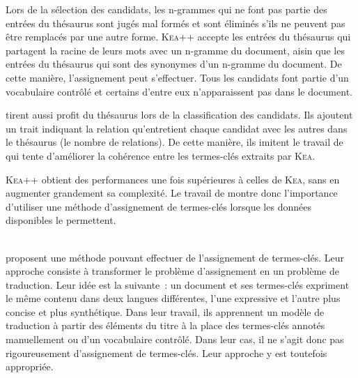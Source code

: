     Lors de la sélection des candidats, les n-grammes qui ne font pas partie des
    entrées du thésaurus sont jugés mal formés et sont éliminés s'ils ne peuvent
    pas être remplacés par une autre forme. \textsc{Kea}++ accepte les entrées
    du thésaurus qui partagent la racine de leurs mots avec un n-gramme du
    document, aisin que les entrées du thésaurus qui sont des synonymes d'un
    n-gramme du document. De cette manière, l'assignement peut s'effectuer. Tous
    les candidats font partie d'un vocabulaire contrôlé et certains d'entre eux
    n'apparaissent pas dans le document.

     tirent aussi profit du thésaurus lors
    de la classification des candidats. Ils ajoutent un trait indiquant la
    relation qu'entretient chaque candidat avec les autres dans le thésaurus (le
    nombre de relations). De cette manière, ils imitent le travail de
     qui tente d'améliorer la cohérence entre
    les termes-clés extraits par \textsc{Kea}.

    \textsc{Kea}++ obtient des performances une fois supérieures à celles de
    \textsc{Kea}, sans en
    augmenter grandement sa complexité. Le travail de
     montre donc l'importance d'utiliser
    une méthode d'assignement de termes-clés lorsque les données disponibles le
    permettent.

    ~\\ proposent une méthode pouvant
    effectuer de l'assignement de termes-clés. Leur approche consiste à
    transformer le problème d'assignement en un problème de traduction. Leur
    idée est la suivante~: un document et ses termes-clés expriment le même
    contenu dans deux langues différentes, l'une expressive et l'autre plus
    concise et plus synthétique. Dans leur travail, ils apprennent un modèle de
    traduction à partir des éléments du titre à la place des termes-clés annotés
    manuellement ou d'un vocabulaire contrôlé. Dans leur cas, il ne s'agit donc
    pas rigoureusement d'assignement de termes-clés. Leur approche y est
    toutefois appropriée.


